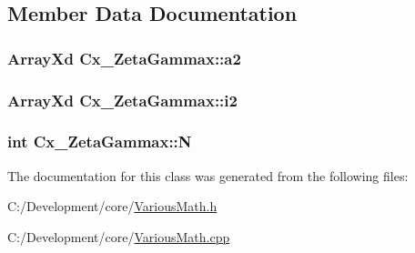 \subsection{Member Data Documentation}
\hypertarget{class_cx___zeta_gammax_a7152607db9f39715b9f519f1f4e56a7e}{
\subsubsection[{a2}]{\setlength{\rightskip}{0pt plus 5cm}Array\-Xd Cx\-\_\-\-Zeta\-Gammax\-::a2\hspace{0.3cm}{\ttfamily [private]}}}\label{class_cx___zeta_gammax_a7152607db9f39715b9f519f1f4e56a7e}
\hypertarget{class_cx___zeta_gammax_ad801450285e3afc4a2f733bda5cbc5c0}{
\subsubsection[{i2}]{\setlength{\rightskip}{0pt plus 5cm}Array\-Xd Cx\-\_\-\-Zeta\-Gammax\-::i2\hspace{0.3cm}{\ttfamily [private]}}}\label{class_cx___zeta_gammax_ad801450285e3afc4a2f733bda5cbc5c0}
\hypertarget{class_cx___zeta_gammax_af0997eb0c66c70aff3b402430726caf4}{
\subsubsection[{N}]{\setlength{\rightskip}{0pt plus 5cm}int Cx\-\_\-\-Zeta\-Gammax\-::\-N\hspace{0.3cm}{\ttfamily [private]}}}\label{class_cx___zeta_gammax_af0997eb0c66c70aff3b402430726caf4}


The documentation for this class was generated from the following files\-:\begin{DoxyCompactItemize}
\item 
C\-:/\-Development/core/\hyperlink{_various_math_8h}{Various\-Math.\-h}\item 
C\-:/\-Development/core/\hyperlink{_various_math_8cpp}{Various\-Math.\-cpp}\end{DoxyCompactItemize}
